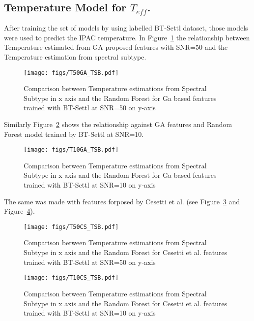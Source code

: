 \subsection{Temperature Model for $T_{eff}$.}
\label {ssub:teff_model}
{
After training the set of models by using labelled BT-Settl dataset, those models 
were used to predict the IPAC temperature.
In Figure~\ref{fig:t50ga_tsb} the relationship between Temperature estimated from 
GA proposed features with SNR=50 and the Temperature estimation 
from spectral subtype.

\begin {figure}
 \begin{center}
 \texttt{[image: figs/T50GA\_TSB.pdf]}
 \caption{Comparison between Temperature estimations from Spectral Subtype 
 in x axis and the Random Forest for Ga based features trained with BT-Settl 
 at SNR=50 on y-axis}
 \label{fig:t50ga_tsb}
 \end{center}
\end {figure}

Similarly Figure~\ref{fig:t10ga_tsb} shows the relationship against GA features 
and Random Forest model trained by BT-Settl at SNR=10.
\begin {figure}
 \begin{center}
 \texttt{[image: figs/T10GA\_TSB.pdf]}
 \caption{Comparison between Temperature estimations from Spectral Subtype 
 in x axis and the Random Forest for Ga based features trained with BT-Settl 
 at SNR=10 on y-axis}
 \label{fig:t10ga_tsb}
 \end{center}
\end {figure}

The same was made with features forposed by Cesetti et al. 
(see Figure~\ref{fig:t50cs_tsb} and Figure~\ref{fig:t10cs_tsb}).

\begin {figure}
 \begin{center}
 \texttt{[image: figs/T50CS\_TSB.pdf]}
 \caption{Comparison between Temperature estimations from Spectral Subtype 
 in x axis and the Random Forest for Cesetti et al. features trained with BT-Settl 
 at SNR=50 on y-axis}
 \label{fig:t50cs_tsb}
 \end{center}
\end {figure}

\begin {figure}
 \begin{center}
 \texttt{[image: figs/T10CS\_TSB.pdf]}
 \caption{Comparison between Temperature estimations from Spectral Subtype 
 in x axis and the Random Forest for Cesetti et al. features trained with BT-Settl 
 at SNR=10 on y-axis}
 \label{fig:t10cs_tsb}
 \end{center}
\end {figure}

}
